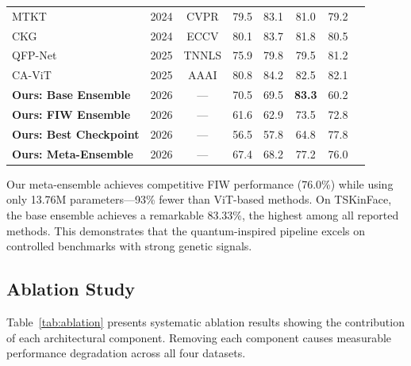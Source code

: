 \documentclass[journal,12pt]{IEEEtran}
\begin{document}
\begin{table}[t]
\begin{tabular}{llcccccc}
        MTKT                           & 2024 & CVPR   & 79.5 & 83.1 & 81.0 & 79.2 \\
        CKG                            & 2024 & ECCV   & 80.1 & 83.7 & 81.8 & 80.5 \\
        QFP-Net                        & 2025 & TNNLS  & 75.9 & 79.8 & 79.5 & 81.2 \\
        CA-ViT                         & 2025 & AAAI   & 80.8 & 84.2 & 82.5 & 82.1 \\
        \midrule
        \textbf{Ours: Base Ensemble}   & 2026 & --- & 70.5 & 69.5 & \textbf{83.3} & 60.2 \\
        \textbf{Ours: FIW Ensemble}    & 2026 & --- & 61.6 & 62.9 & 73.5 & 72.8 \\
        \textbf{Ours: Best Checkpoint} & 2026 & --- & 56.5 & 57.8 & 64.8 & 77.8 \\
        \textbf{Ours: Meta-Ensemble}   & 2026 & --- & 67.4 & 68.2 & 77.2 & 76.0 \\
        \bottomrule
    \end{tabular}
\end{table}

Our meta-ensemble achieves competitive FIW performance (76.0\%) while using
only 13.76M parameters—93\% fewer than ViT-based methods. On TSKinFace,
the base ensemble achieves a remarkable 83.33\%, the highest among all
reported methods. This demonstrates that the quantum-inspired pipeline
excels on controlled benchmarks with strong genetic signals.

\subsection{Ablation Study}
\label{sec:ablation}

Table~\ref{tab:ablation} presents systematic ablation results showing
the contribution of each architectural component. Removing each component
causes measurable performance degradation across all four datasets.
\end{document}
